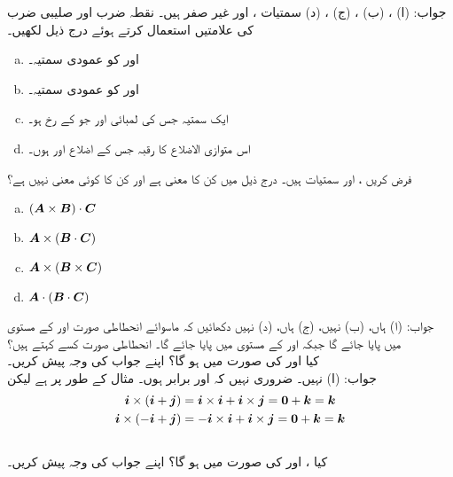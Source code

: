 جواب:\quad
(ا) ، 
(ب) ، (ج) ، (د) 
سمتیات ،  اور  غیر صفر ہیں۔ نقطہ ضرب اور صلیبی ضرب کی علامتیں استعمال کرتے ہوئے درج ذیل لکھیں۔
\begin{enumerate}[a.]
\item
{} اور  کو عمودی سمتیہ۔
\item
{} اور  کو عمودی سمتیہ۔
\item
ایک سمتیہ جس کی لمبائی  اور جو  کے رخ ہو۔
\item
اس متوازی الاضلاع کا رقبہ جس کے اضلاع  اور  ہوں۔

\end{enumerate}
فرض کریں ،  اور  سمتیات ہیں۔ درج ذیل میں کن کا معنی ہے اور کن کا کوئی معنی نہیں ہے؟
\begin{enumerate}[a.]
\item
$({{\boldsymbol{A}}}\times{\ensuremath{{\boldsymbol{B}}}})\cdot{\ensuremath{{\boldsymbol{C}}}}$
\item
${{\boldsymbol{A}}}\times({{\boldsymbol{B}}}\cdot{\ensuremath{{\boldsymbol{C}}}})$
\item
${{\boldsymbol{A}}}\times({{\boldsymbol{B}}}\times{\ensuremath{{\boldsymbol{C}}}})$
\item
${{\boldsymbol{A}}}\cdot({{\boldsymbol{B}}}\cdot{\ensuremath{{\boldsymbol{C}}}})$
\end{enumerate}
جواب:\quad
(ا) ہاں، (ب) نہیں، (ج) ہاں، (د) نہیں
دکھائیں کہ ماسوائے انحطاطی صورت  اور  کے مستوی میں  پایا جائے گا جبکہ  اور  کے مستوی میں  پایا جائے گا۔ انحطاطی صورت کسے کہتے ہیں؟
\\
کیا  اور  کی صورت میں  ہو گا؟ اپنے جواب کی وجہ پیش کریں۔ \\
جواب:\quad
(ا) نہیں۔ ضروری نہیں کہ  اور  برابر ہوں۔ مثال کے طور پر  ہے لیکن
\begin{align*}
{\boldsymbol{i}}\times({\boldsymbol{i}}+{\boldsymbol{j}})&={\boldsymbol{i}}\times{\boldsymbol{i}}+{\boldsymbol{i}}\times{\boldsymbol{j}}={{\boldsymbol{0}}}+{\boldsymbol{k}}={\boldsymbol{k}}\\
{\boldsymbol{i}}\times(-{\boldsymbol{i}}+{\boldsymbol{j}})&=-{\boldsymbol{i}}\times{\boldsymbol{i}}+{\boldsymbol{i}}\times{\boldsymbol{j}}={{\boldsymbol{0}}}+{\boldsymbol{k}}={\boldsymbol{k}}
\end{align*}
\\
کیا ،   اور  کی صورت میں  ہو گا؟ اپنے جواب کی وجہ پیش کریں۔

